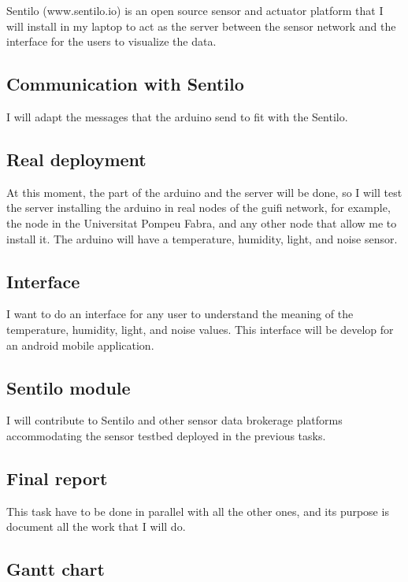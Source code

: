 \documentclass[12pt, b5paper,twoside]{tesi_upf}
\begin{document}
Sentilo (www.sentilo.io) is an open source sensor and actuator platform that I will install in my laptop to act as the server between the sensor network and the interface for the users to visualize the data. 

\subsection{Communication with Sentilo}

I will adapt the messages that the arduino send to fit with the Sentilo.

\subsection{Real deployment}

At this moment, the part of the arduino and the server will be done, so I will test the server installing the arduino in real nodes of the guifi network, for example, the node in the Universitat Pompeu Fabra, and any other node that allow me to install it. The arduino will have a temperature, humidity, light, and noise sensor.

\subsection{Interface}

I want to do an interface for any user to understand the meaning of the temperature, humidity, light, and noise values. This interface will be develop for an android mobile application.

\subsection{Sentilo module}

I will contribute to Sentilo and other sensor data brokerage platforms accommodating the sensor testbed deployed in the previous tasks.

\subsection{Final report}

This task have to be done in parallel with all the other ones, and its purpose is document all the work that I will do.

\subsection{Gantt chart}
\end{document}

